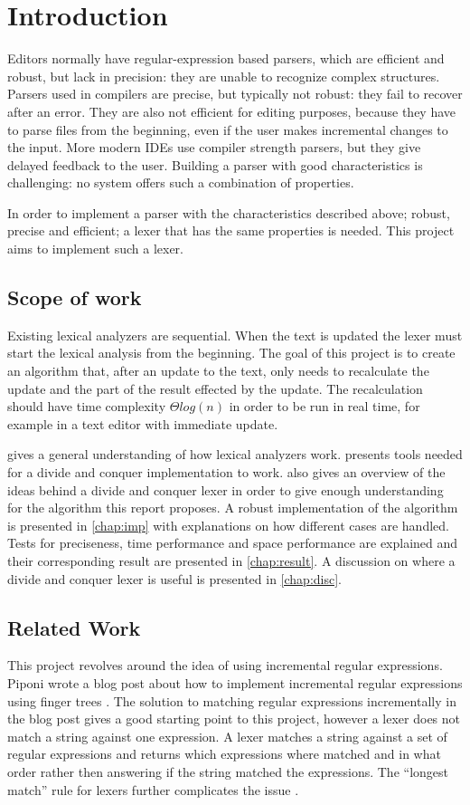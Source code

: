 \chapter{Introduction}
Editors normally have regular-expression based parsers, which are efficient and
robust, but lack in precision: they are unable to recognize complex structures.
Parsers used in compilers are precise, but typically not robust: they fail to
recover after an error. They are also not efficient for editing purposes,
because they have to parse files from the beginning, even if the user makes
incremental changes to the input. More modern IDEs use compiler strength
parsers, but they give delayed feedback to the user. Building a parser with good
characteristics is challenging: no system offers such a combination of
properties.

In order to implement a parser with the characteristics described above; robust,
precise and efficient; a lexer that has the same properties is needed. This
project aims to implement such a lexer.

\section{Scope of work}
Existing lexical analyzers are sequential. When the text is updated the lexer
must start the lexical analysis from the beginning. The goal of this project is
to create an algorithm that, after an update to the text, only needs to
recalculate the update and the part of the result effected by the update. The
recalculation should have time complexity $\Theta log(n)$ in order to be run in
real time, for example in a text editor with immediate update.

 gives a general understanding of how lexical analyzers work.
 presents tools needed for a divide and conquer
implementation to work.  also gives an overview of the
ideas behind a divide and conquer lexer in order to give enough understanding
for the algorithm this report proposes. A robust implementation of the algorithm
is presented in \cref{chap:imp} with explanations on how different cases are
handled. Tests for preciseness, time performance and space performance are
explained and their corresponding result are presented in \cref{chap:result}.
A discussion on where a divide and conquer lexer is useful is presented in
\cref{chap:disc}.

\section{Related Work}
This project revolves around the idea of using incremental regular expressions.
Piponi wrote a blog post about how to implement incremental regular
expressions using finger trees \cite{blog}. The solution to matching regular expressions
incrementally in the blog post gives a good starting point to this project,
however a lexer does not match a string against one expression. A lexer matches a
string against a set of regular expressions and returns which expressions where
matched and in what order rather then answering if the string matched the
expressions. The ``longest match'' rule for lexers further complicates the issue
\cite{blog}.

